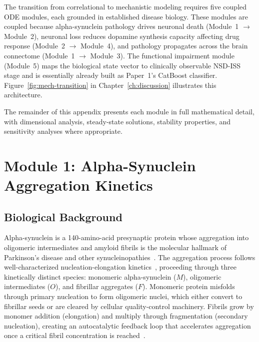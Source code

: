 The transition from correlational to mechanistic modeling requires five coupled ODE modules, each grounded in established disease biology. These modules are coupled because alpha-synuclein pathology drives neuronal death (Module~1 $\to$ Module~2), neuronal loss reduces dopamine synthesis capacity affecting drug response (Module~2 $\to$ Module~4), and pathology propagates across the brain connectome (Module~1 $\to$ Module~3). The functional impairment module (Module~5) maps the biological state vector to clinically observable NSD-ISS stage and is essentially already built as Paper~1's CatBoost classifier. Figure~\ref{fig:mech-transition} in Chapter~\ref{ch:discussion} illustrates this architecture.

The remainder of this appendix presents each module in full mathematical detail, with dimensional analysis, steady-state solutions, stability properties, and sensitivity analyses where appropriate.

\section{Module 1: Alpha-Synuclein Aggregation Kinetics}
\label{sec:mech-aggregation}

\subsection{Biological Background}

Alpha-synuclein is a 140-amino-acid presynaptic protein whose aggregation into oligomeric intermediates and amyloid fibrils is the molecular hallmark of Parkinson's disease and other synucleinopathies~\cite{kalia2015}. The aggregation process follows well-characterized nucleation-elongation kinetics~\cite{knowles2009,dear2020}, proceeding through three kinetically distinct species: monomeric alpha-synuclein ($M$), oligomeric intermediates ($O$), and fibrillar aggregates ($F$). Monomeric protein misfolds through primary nucleation to form oligomeric nuclei, which either convert to fibrillar seeds or are cleared by cellular quality-control machinery. Fibrils grow by monomer addition (elongation) and multiply through fragmentation (secondary nucleation), creating an autocatalytic feedback loop that accelerates aggregation once a critical fibril concentration is reached~\cite{cohen2012,meisl2014}.

